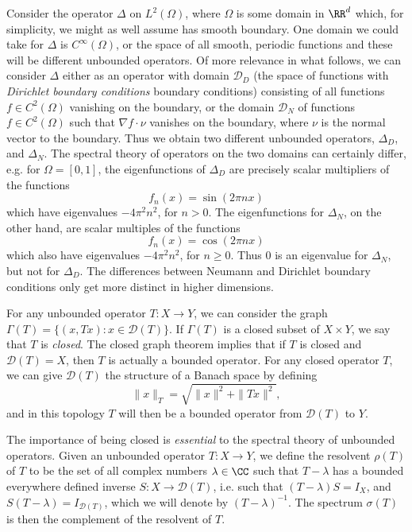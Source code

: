 \begin{example}
    Consider the operator $\Delta$ on $L^2(\Omega)$, where $\Omega$ is some domain in $\RR^d$ which, for simplicity, we might as well assume has smooth boundary. One domain we could take for $\Delta$ is $C^\infty(\Omega)$, or the space of all smooth, periodic functions and these will be different unbounded operators. Of more relevance in what follows, we can consider $\Delta$ either as an operator with domain $\mathcal{D}_D$ (the space of functions with \emph{Dirichlet boundary conditions} boundary conditions) consisting of all functions $f \in C^2(\Omega)$ vanishing on the boundary, or the domain $\mathcal{D}_N$ of functions $f \in C^2(\Omega)$ such that $\nabla f \cdot \nu$ vanishes on the boundary, where $\nu$ is the normal vector to the boundary. Thus we obtain two different unbounded operators, $\Delta_D$, and $\Delta_N$. The spectral theory of operators on the two domains can certainly differ, e.g. for $\Omega = [0,1]$, the eigenfunctions of $\Delta_D$ are precisely scalar multipliers of the functions
    \[ f_n(x) = \sin(2 \pi n x) \]
    which have eigenvalues $- 4 \pi^2 n^2$, for $n > 0$. The eigenfunctions for $\Delta_N$, on the other hand, are scalar multiples of the functions
    \[ f_n(x) = \cos(2 \pi n x) \]
    which also have eigenvalues $- 4 \pi^2 n^2$, for $n \geq 0$. Thus $0$ is an eigenvalue for $\Delta_N$, but not for $\Delta_D$. The differences between Neumann and Dirichlet boundary conditions only get more distinct in higher dimensions.
\end{example}

For any unbounded operator $T: X \to Y$, we can consider the graph $\Gamma(T) = \{ (x,Tx): x \in \mathcal{D}(T) \}$. If $\Gamma(T)$ is a closed subset of $X \times Y$, we say that $T$ is \emph{closed}. The closed graph theorem implies that if $T$ is closed and $\mathcal{D}(T) = X$, then $T$ is actually a bounded operator. For any closed operator $T$, we can give $\mathcal{D}(T)$ the structure of a Banach space by defining
%
\[ \| x \|_T = \sqrt{\| x \|^2 + \| Tx \|^2}, \]
%
and in this topology $T$ will then be a bounded operator from $\mathcal{D}(T)$ to $Y$.

The importance of being closed is \emph{essential} to the spectral theory of unbounded operators. Given an unbounded operator $T: X \to Y$, we define the resolvent $\rho(T)$ of $T$ to be the set of all complex numbers $\lambda \in \CC$ such that $T - \lambda$ has a bounded everywhere defined inverse $S: X \to \mathcal{D}(T)$, i.e. such that $(T - \lambda) S = I_X$, and $S (T - \lambda) = I_{\mathcal{D}(T)}$, which we will denote by $(T - \lambda)^{-1}$. The spectrum $\sigma(T)$ is then the complement of the resolvent of $T$.

